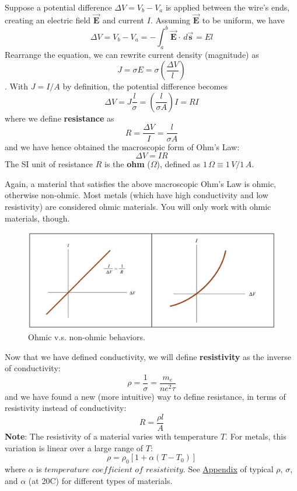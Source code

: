 \documentclass[11pt, letterpaper]{article}
\newcommand{\bv}[2][]{\bm{\vec{#2}_{#1}}}
\begin{document}
Suppose a potential difference $\Delta V = V_b - V_a$ is applied between the wire's ends, creating an electric field $\bv{E}$ and current $I$. Assuming $\bv{E}$ to be uniform, we have \[\Delta V = V_b - V_a = -\int_a^b\bv{E}\cdot\, d\bv{s} = El\] Rearrange the equation, we can rewrite current density (magnitude) as \[J = \sigma E = \sigma\left(\frac{\Delta V}{l}\right)\]. With $J = I/A$ by definition, the potential difference becomes \[\Delta V = J\frac{l}{\sigma} = \left(\frac{l}{\sigma A}\right)I = RI\] where we define \textbf{resistance} as 
\begin{equation}\label{eqn:resistance}
	\boxed{R = \frac{\Delta V}{I} = \frac{l}{\sigma A}} 
\end{equation}
and we have hence obtained the macroscopic form of Ohm's Law:
\begin{equation}\label{eqn:macro-ohm}
	\boxed{\Delta V = IR}
\end{equation}
The SI unit of resistance $R$ is the \textbf{ohm} ($\Omega$), defined as $1\,\Omega \equiv 1\,V/1\,A$. 

Again, a material that satisfies the above macroscopic Ohm's Law is ohmic, otherwise non-ohmic. Most metals (which have high conductivity and low resistivity) are considered ohmic materials. You will only work with ohmic materials, though. 
\begin{figure}[h!]
	\centering
	\includegraphics[scale=0.5]{ohm.png}
	\caption{Ohmic v.s. non-ohmic behaviors.}
	\label{fig:ohm}
\end{figure}

Now that we have defined conductivity, we will define \textbf{resistivity} as the inverse of conductivity:
\begin{equation}\label{eqn:resistivity}
	\boxed{\rho = \frac{1}{\sigma} = \frac{m_e}{ne^2\tau}}
\end{equation}
and we have found a new (more intuitive) way to define resistance, in terms of resistivity instead of conductivity: 
\begin{equation}\label{eqn:resist}
	\boxed{R = \frac{\rho l}{A}}
\end{equation}
\textbf{Note}: The resistivity of a material varies with temperature $T$. For metals, this variation is linear over a large range of $T$:
\begin{equation}\label{eqn:temp}
	\boxed{\rho = \rho_0[1 + \alpha(T - T_0)]}
\end{equation}
where $\alpha$ is $\textit{temperature coefficient of resistivity}$. See \hyperref[sec:app]{Appendix} of typical $\rho$, $\sigma$, and $\alpha$ (at 20\textdegree{}C) for different types of materials.
\newpage
\end{document}
